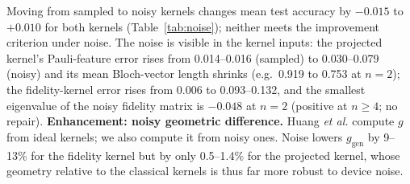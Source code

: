 \documentclass[conference]{IEEEtran}
\begin{document}
\begin{table}[t]
\centering
\caption{Original labels: test accuracy at three levels (mean over 5 seeds), $\Delta A=A^Q_{\mathrm{noisy}}-A^{C^\ast}$ (mean $\pm$ std), and $g_{\mathrm{gen}}$ vs.\ $C^\ast$ from ideal / noisy kernels.}
\label{tab:noise}
\scriptsize
\setlength{\tabcolsep}{2.2pt}
\end{table}

Moving from sampled to noisy kernels changes mean test accuracy by $-0.015$ to $+0.010$ for both kernels (Table~\ref{tab:noise}); neither meets the improvement criterion under noise. The noise is visible in the kernel inputs: the projected kernel's Pauli-feature error rises from 0.014--0.016 (sampled) to 0.030--0.079 (noisy) and its mean Bloch-vector length shrinks (e.g.\ 0.919 to 0.753 at $n=2$); the fidelity-kernel error rises from 0.006 to 0.093--0.132, and the smallest eigenvalue of the noisy fidelity matrix is $-0.048$ at $n=2$ (positive at $n\ge4$; no repair). \textbf{Enhancement: noisy geometric difference.} Huang \textit{et al.} compute $g$ from ideal kernels; we also compute it from noisy ones. Noise lowers $g_{\mathrm{gen}}$ by 9--13\% for the fidelity kernel but by only 0.5--1.4\% for the projected kernel, whose geometry relative to the classical kernels is thus far more robust to device noise.
\end{document}
